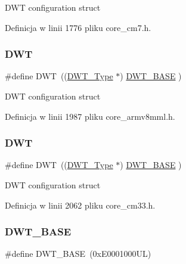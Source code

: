 D\+WT configuration struct 

Definicja w linii 1776 pliku core\+\_\+cm7.\+h.

\mbox{\label{group___c_m_s_i_s__core__base_gabbe5a060185e1d5afa3f85b14e10a6ce}} 
\subsubsection{\texorpdfstring{D\+WT}{DWT}\hspace{0.1cm}{\footnotesize\ttfamily [7/8]}}
{\footnotesize\ttfamily \#define D\+WT~((\hyperlink{struct_d_w_t___type}{D\+W\+T\+\_\+\+Type}       $\ast$)     \hyperlink{group___c_m_s_i_s__core__base_gafdab534f961bf8935eb456cb7700dcd2}{D\+W\+T\+\_\+\+B\+A\+SE}         )}

D\+WT configuration struct 

Definicja w linii 1987 pliku core\+\_\+armv8mml.\+h.

\mbox{\label{group___c_m_s_i_s__core__base_gabbe5a060185e1d5afa3f85b14e10a6ce}} 
\subsubsection{\texorpdfstring{D\+WT}{DWT}\hspace{0.1cm}{\footnotesize\ttfamily [8/8]}}
{\footnotesize\ttfamily \#define D\+WT~((\hyperlink{struct_d_w_t___type}{D\+W\+T\+\_\+\+Type}       $\ast$)     \hyperlink{group___c_m_s_i_s__core__base_gafdab534f961bf8935eb456cb7700dcd2}{D\+W\+T\+\_\+\+B\+A\+SE}         )}

D\+WT configuration struct 

Definicja w linii 2062 pliku core\+\_\+cm33.\+h.

\mbox{\label{group___c_m_s_i_s__core__base_gafdab534f961bf8935eb456cb7700dcd2}} 
\subsubsection{\texorpdfstring{D\+W\+T\+\_\+\+B\+A\+SE}{DWT\_BASE}\hspace{0.1cm}{\footnotesize\ttfamily [1/8]}}
{\footnotesize\ttfamily \#define D\+W\+T\+\_\+\+B\+A\+SE~(0x\+E0001000\+U\+L)}


